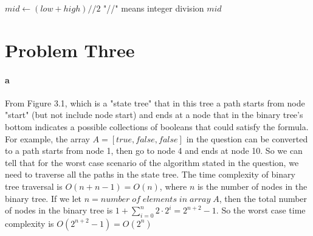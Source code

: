 \documentclass[paper=a4, fontsize=11pt]{scrartcl} %
\numberwithin{equation}{section} %
\numberwithin{figure}{section} %
\numberwithin{table}{section} %
\begin{document}
\begin{algorithm}
\begin{algorithmic}[1]
            \State
            
            \State $mid\gets(low + high)//2$ \Comment "//" means integer division
            \EndIf
            \State \Return $mid$
            \Else
            	\State \Return {}
            	\Else
            	\State \Return {}
            	\EndIf
            \EndIf
            \State {}
            
            

            \EndFunction
            
        \end{algorithmic}
    \end{algorithm}


\section{Problem Three}
\paragraph{a} From Figure 3.1, which is a "state tree" that in this tree a path starts from node "start" (but not include node start) and ends at a node that in the binary tree's bottom indicates a possible collections of booleans that could satisfy the formula. For example, the array $A = [true, false, false]$ in the question can be converted to a path starts from node 1, then go to node 4 and ends at node 10. So we can tell that for the worst case scenario of the algorithm stated in the question, we need to traverse all the paths in the state tree. The time complexity of binary tree traversal is $O(n+n-1)=O(n)$, where $n$ is the number of nodes in the binary tree. If we let $n=number\;of\;elements\;in\;array\;A$, then the total number of nodes in the binary tree is $1 + \sum_{i=0}^n 2\cdot 2^i = 2^{n+2}-1 $. So the worst case time complexity is $O(2^{n+2}-1)=O(2^n)$
\end{document}

